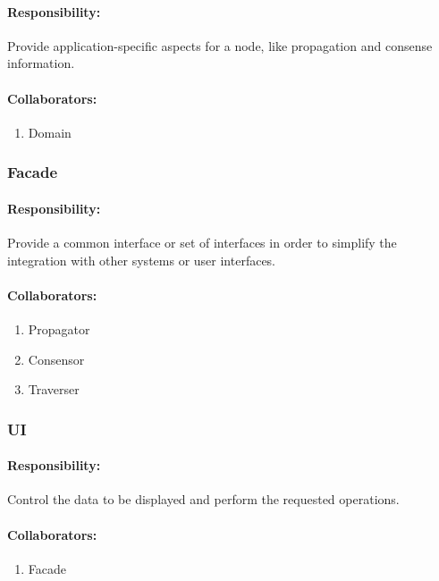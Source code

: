 \documentclass[a4paper,10pt]{article}
\begin{document}
	  \paragraph{Responsibility:} Provide application-specific aspects for a node, like propagation and consense information.
\paragraph{Collaborators:}
      \begin{enumerate}
       \item Domain
      \end{enumerate}
	  
\subsubsection{Facade}

\paragraph{Responsibility:} Provide a common interface or set of interfaces in order to simplify the integration with other systems or user interfaces.
\paragraph{Collaborators:}
      \begin{enumerate}
       \item Propagator
       \item Consensor
       \item Traverser
      \end{enumerate}
	  
	  \subsubsection{UI}

\paragraph{Responsibility:} Control the data to be displayed and perform the requested operations.
\paragraph{Collaborators:}
      \begin{enumerate}
       \item Facade
      \end{enumerate}
	  
\end{document}
